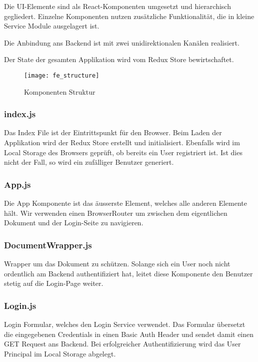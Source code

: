 Die UI-Elemente sind als React-Komponenten umgesetzt und hierarchisch gegliedert.
Einzelne Komponenten nutzen zusätzliche Funktionalität, die in kleine Service Module ausgelagert ist.

Die Anbindung ans Backend ist mit zwei unidirektionalen Kanälen realisiert.

Der State der gesamten Applikation wird vom Redux Store bewirtschaftet.

\begin{figure}[H]
    \centering
    \texttt{[image: fe\_structure]}
    \caption{Komponenten Struktur}
    \label{fig: Fe_Structure}
\end{figure}

\subsubsection*{index.js}
Das Index File ist der Eintrittspunkt für den Browser.
Beim Laden der Applikation wird der Redux Store erstellt und initialisiert.
Ebenfalls wird im Local Storage des Browsers geprüft, ob bereits ein User registriert ist.
Ist dies nicht der Fall, so wird ein zufälliger Benutzer generiert.

\subsubsection*{App.js}
Die App Komponente ist das äusserste Element, welches alle anderen Elemente hält.
Wir verwenden einen BrowserRouter um zwischen dem eigentlichen Dokument und der Login-Seite zu navigieren.

\subsubsection*{DocumentWrapper.js}
Wrapper um das Dokument zu schützen.
Solange sich ein User noch nicht ordentlich am Backend authentifiziert hat, leitet diese Komponente den Benutzer stetig auf die Login-Page weiter.

\subsubsection*{Login.js}
Login Formular, welches den Login Service verwendet.
Das Formular übersetzt die eingegebenen Credentials in einen Basic Auth Header und sendet damit einen GET Request ans Backend.
Bei erfolgreicher Authentifizierung wird das User Principal im Local Storage abgelegt.


